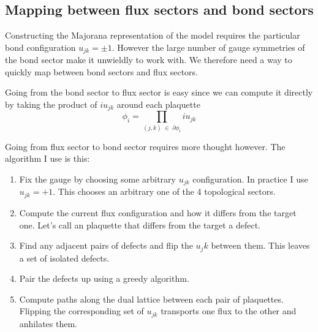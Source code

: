 \hypertarget{mapping-between-flux-sectors-and-bond-sectors}{%
\subsection{Mapping between flux sectors and bond
sectors}\label{mapping-between-flux-sectors-and-bond-sectors}}

Constructing the Majorana representation of the model requires the
particular bond configuration \(u_{jk} = \pm 1\). However the large
number of gauge symmetries of the bond sector make it unwieldly to work
with. We therefore need a way to quickly map between bond sectors and
flux sectors.

Going from the bond sector to flux sector is easy since we can compute
it directly by taking the product of \(i u_{jk}\) around each plaquette
\[ \phi_i = \prod_{(j,k) \; \in \; \partial \phi_i} i u_{jk}\]

Going from flux sector to bond sector requires more thought however. The
algorithm I use is this:

\begin{enumerate}
\def\labelenumi{\arabic{enumi}.}
\item
  Fix the gauge by choosing some arbitrary \(u_{jk}\) configuration. In
  practice I use \(u_{jk} = +1\). This chooses an arbitrary one of the 4
  topological sectors.
\item
  Compute the current flux configuration and how it differs from the
  target one. Let's call an plaquette that differs from the target a
  defect.
\item
  Find any adjacent pairs of defects and flip the \(u_jk\) between them.
  This leaves a set of isolated defects.
\item
  Pair the defects up using a greedy algorithm.
\item
  Compute paths along the dual lattice between each pair of plaquettes.
  Flipping the corresponding set of \(u_{jk}\) transports one flux to
  the other and anhilates them.
\end{enumerate}

